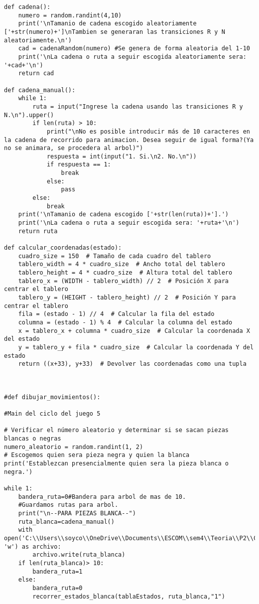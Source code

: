 \begin{lstlisting}
def cadena():
    numero = random.randint(4,10)
    print('\nTamanio de cadena escogido aleatoriamente ['+str(numero)+']\nTambien se generaran las transiciones R y N aleatoriamente.\n')
    cad = cadenaRandom(numero) #Se genera de forma aleatoria del 1-10
    print('\nLa cadena o ruta a seguir escogida aleatoriamente sera: '+cad+'\n')
    return cad

def cadena_manual():
    while 1:
        ruta = input("Ingrese la cadena usando las transiciones R y N.\n").upper()
        if len(ruta) > 10:
            print("\nNo es posible introducir más de 10 caracteres en la cadena de recorrido para animacion. Desea seguir de igual forma?(Ya no se animara, se procedera al arbol)")
            respuesta = int(input("1. Si.\n2. No.\n"))
            if respuesta == 1:
                break
            else:
                pass
        else:
            break
    print('\nTamanio de cadena escogido ['+str(len(ruta))+'].')
    print('\nLa cadena o ruta a seguir escogida sera: '+ruta+'\n')
    return ruta

def calcular_coordenadas(estado):
    cuadro_size = 150  # Tamaño de cada cuadro del tablero
    tablero_width = 4 * cuadro_size  # Ancho total del tablero
    tablero_height = 4 * cuadro_size  # Altura total del tablero
    tablero_x = (WIDTH - tablero_width) // 2  # Posición X para centrar el tablero
    tablero_y = (HEIGHT - tablero_height) // 2  # Posición Y para centrar el tablero
    fila = (estado - 1) // 4  # Calcular la fila del estado
    columna = (estado - 1) % 4  # Calcular la columna del estado
    x = tablero_x + columna * cuadro_size  # Calcular la coordenada X del estado
    y = tablero_y + fila * cuadro_size  # Calcular la coordenada Y del estado
    return ((x+33), y+33)  # Devolver las coordenadas como una tupla



#def dibujar_movimientos():

#Main del ciclo del juego 5

# Verificar el número aleatorio y determinar si se sacan piezas blancas o negras
numero_aleatorio = random.randint(1, 2)
# Escogemos quien sera pieza negra y quien la blanca
print('Establezcan presencialmente quien sera la pieza blanca o negra.')

while 1:
    bandera_ruta=0#Bandera para arbol de mas de 10.
    #Guardamos rutas para arbol.
    print("\n--PARA PIEZAS BLANCA--")
    ruta_blanca=cadena_manual()
    with open('C:\\Users\\soyco\\OneDrive\\Documents\\ESCOM\\sem4\\Teoria\\P2\\Chess\\output\\ruta_blanca.txt', 'w') as archivo:
        archivo.write(ruta_blanca)
    if len(ruta_blanca)> 10:
        bandera_ruta=1
    else:
        bandera_ruta=0
        recorrer_estados_blanca(tablaEstados, ruta_blanca,"1")


\end{lstlisting}

